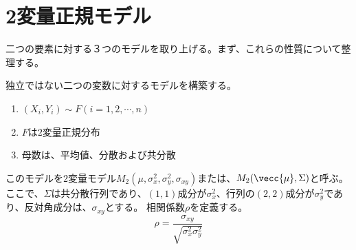 \chapter{2変量正規モデル}

二つの要素に対する３つのモデルを取り上げる。まず、これらの性質について整理する。


独立ではない二つの変数に対するモデルを構築する。
\begin{enumerate}
 \item $(X_i,Y_i)\sim F (i=1,2,\cdots,n)$
 \item $F$は$2$変量正規分布
 \item 母数は、平均値、分散および共分散
\end{enumerate}
このモデルを$2$変量モデル$M_{2}(\mu,\sigma^2_x,\sigma^2_y,\sigma_{xy})$または、$M_2(\vecc{\mu},\Sigma)$と呼ぶ。ここで、$\Sigma$は共分散行列であり、$(1,1)$成分が$\sigma_x^2$、行列の$(2,2)$成分が$\sigma_y^2$であり、反対角成分は、$\sigma_{xy}$とする。
相関係数$\rho$を定義する。
\begin{equation*}
 \rho = \frac{\sigma_{xy}}{\sqrt{\sigma_x^2\sigma_y^2}}
\end{equation*}

